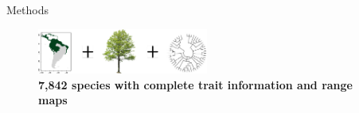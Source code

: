 \documentclass[final]{beamer}
\newlength{\onecolwid}
\begin{document}
\begin{frame}[t]
\begin{columns}[t]
\begin{column}{\onecolwid}
\begin{block}{Methods}
%
%
%
%
%
%
%
%
%
%

\begin{figure}[h]
	\centering
	\includegraphics[width=0.5\textwidth]{./figures/Methods_figs.pdf}
	\caption{\textbf{7,842 species with complete trait information and range maps}}
	\label{fig:methods}
\end{figure}


\hfill


\end{block}
\end{column}
\end{columns}
\end{frame}
\end{document}
